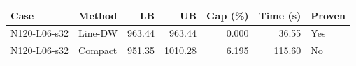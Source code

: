 \begin{tabular}{llrrrrl}
\hline
Case & Method & LB & UB & Gap (\%) & Time (s) & Proven \\
\hline
N120-L06-s32 & Line-DW & 963.44 & 963.44 & 0.000 & 36.55 & Yes \\
N120-L06-s32 & Compact & 951.35 & 1010.28 & 6.195 & 115.60 & No \\
\hline
\end{tabular}

